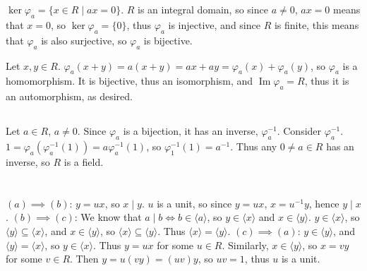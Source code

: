 \documentclass[11pt]{article}
\DeclareMathOperator{\im}{Im}
\begin{document}
\renewcommand{\thesubsection}{\thesection.\alph{subsection}}
\section{} %
\subsection{} %
$\ker\varphi_a=\{x\in R\mid ax=0\}$. $R$ is an integral domain, so since
$a\neq0$, $ax=0$ means that $x=0$, so $\ker\varphi_a=\{0\}$, thus $\varphi_a$
is injective, and since $R$ is finite, this means that $\varphi_a$ is also
surjective, so $\varphi_a$ is bijective.

Let $x,y\in R$. $\varphi_a(x+y)=a(x+y)=ax+ay=\varphi_a(x)+\varphi_a(y)$, so
$\varphi_a$ is a homomorphism. It is bijective, thus an isomorphism, and
$\im\varphi_a=R$, thus it is an automorphism, as desired.


\subsection{} %
Let $a\in R$, $a\neq0$. Since $\varphi_a$ is a bijection, it has an inverse,
$\varphi_a^{-1}$. Consider $\varphi_a^{-1}$.
$1=\varphi_a(\varphi_a^{-1}(1))=a\varphi_a^{-1}(1)$, so
$\varphi_1^{-1}(1)=a^{-1}$. Thus any $0\neq a\in R$ has an inverse, so $R$ is
a field.


\section{} %
$(a)\implies(b)$: $y=ux$, so $x\mid y$. $u$ is a unit, so since $y=ux$, $x=u^{-1}y$, hence $y\mid x$.
\newline
\newline
$(b)\implies(c)$: We know that $a\mid b\iff b\in \langle a\rangle$, so
$y\in\langle x\rangle$ and $x\in\langle y\rangle$. $y\in\langle x\rangle$, so
$\langle y\rangle\subseteq\langle x\rangle$, and $x\in\langle y\rangle$, so
$\langle x\rangle\subseteq\langle y\rangle$. Thus
$\langle x\rangle=\langle y\rangle$.
\newline
\newline
$(c)\implies(a)$: $y\in\langle y\rangle$, and
$\langle y\rangle=\langle x\rangle$, so $y\in\langle x\rangle$. Thus $y=ux$
for some $u\in R$. Similarly, $x\in\langle y\rangle$, so $x=vy$ for some
$v\in R$. Then $y=u(vy)=(uv)y$, so $uv=1$, thus $u$ is a unit.


\section{} %
\end{document}

